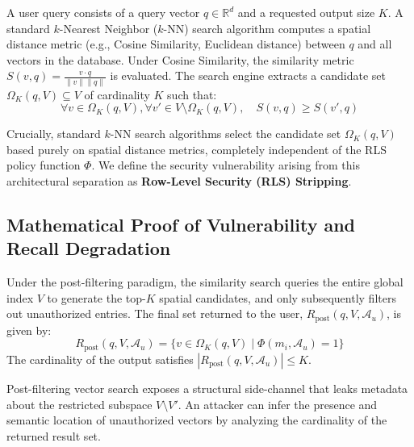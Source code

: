 \documentclass[sigconf]{acmart}
\begin{document}
A user query consists of a query vector $q \in \mathbb{R}^d$ and a requested output size $K$. A standard $k$-Nearest Neighbor ($k$-NN) search algorithm computes a spatial distance metric (e.g., Cosine Similarity, Euclidean distance) between $q$ and all vectors in the database. Under Cosine Similarity, the similarity metric $S(v, q) = \frac{v \cdot q}{\|v\| \|q\|}$ is evaluated. The search engine extracts a candidate set $\Omega_K(q, V) \subseteq V$ of cardinality $K$ such that:
\begin{equation}
    \forall v \in \Omega_K(q, V), \forall v' \in V \setminus \Omega_K(q, V), \quad S(v, q) \ge S(v', q)
\end{equation}

Crucially, standard $k$-NN search algorithms select the candidate set $\Omega_K(q, V)$ based purely on spatial distance metrics, completely independent of the RLS policy function $\Phi$. We define the security vulnerability arising from this architectural separation as \textbf{Row-Level Security (RLS) Stripping}.

\subsection{Mathematical Proof of Vulnerability and Recall Degradation}
Under the post-filtering paradigm, the similarity search queries the entire global index $V$ to generate the top-$K$ spatial candidates, and only subsequently filters out unauthorized entries. The final set returned to the user, $R_{\text{post}}(q, V, \mathcal{A}_u)$, is given by:
\begin{equation}
    R_{\text{post}}(q, V, \mathcal{A}_u) = \{ v \in \Omega_K(q, V) \mid \Phi(m_i, \mathcal{A}_u) = 1 \}
\end{equation}
The cardinality of the output satisfies $|R_{\text{post}}(q, V, \mathcal{A}_u)| \le K$.

\begin{theorem}
Post-filtering vector search exposes a structural side-channel that leaks metadata about the restricted subspace $V \setminus V'$. An attacker can infer the presence and semantic location of unauthorized vectors by analyzing the cardinality of the returned result set.
\end{theorem}
\end{document}
